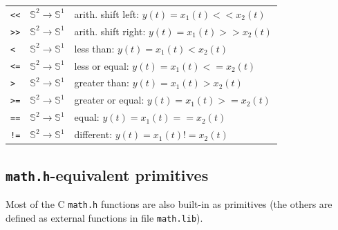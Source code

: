 \documentclass{article}
\begin{document}
\begin{tabular}{|l|l|l|}
\texttt{<<} & $\mathbb{S}^{2}\rightarrow\mathbb{S}^{1}$ & arith. shift left: $y(t)=x_{1}(t) << x_{2}(t)$   \\
\texttt{>>} & $\mathbb{S}^{2}\rightarrow\mathbb{S}^{1}$ & arith. shift right: $y(t)=x_{1}(t) >> x_{2}(t)$   \\


\texttt{<} & $\mathbb{S}^{2}\rightarrow\mathbb{S}^{1}$ & less than: $y(t)=x_{1}(t) < x_{2}(t)$   \\
\texttt{<=} & $\mathbb{S}^{2}\rightarrow\mathbb{S}^{1}$ & less or equal: $y(t)=x_{1}(t) <= x_{2}(t)$   \\
\texttt{>} & $\mathbb{S}^{2}\rightarrow\mathbb{S}^{1}$ & greater than: $y(t)=x_{1}(t) > x_{2}(t)$   \\
\texttt{>=} & $\mathbb{S}^{2}\rightarrow\mathbb{S}^{1}$ & greater or equal: $y(t)=x_{1}(t) >= x_{2}(t)$   \\
\texttt{==} & $\mathbb{S}^{2}\rightarrow\mathbb{S}^{1}$ & equal: $y(t)=x_{1}(t) == x_{2}(t)$   \\
\texttt{!=} & $\mathbb{S}^{2}\rightarrow\mathbb{S}^{1}$ & different: $y(t)=x_{1}(t) != x_{2}(t)$   \\

\hline

\end{tabular}

\vspace{5 mm}


\subsection{\texttt{math.h}-equivalent primitives}

Most of the C \texttt{math.h} functions are also built-in as primitives (the others are defined as external functions in file \texttt{math.lib}).
\end{document}

